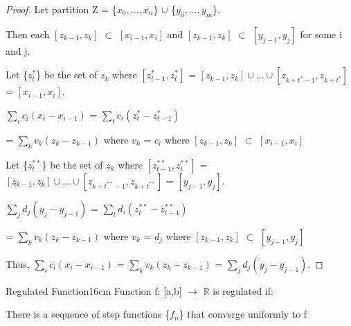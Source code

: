     \begin{proof}
        Let partition Z = \{$x_0,...,x_n$\} $\cup$ \{$y_0,...,y_m$\}.

        Then each $[z_{k-1},z_k]$ $\subset$ $[x_{i-1},x_i]$
        and $[z_{k-1},z_k]$ $\subset$ $[y_{j-1},y_j]$ for some i and j.

        Let \{$z_t^*$\} be the set of $z_k$
        where $[z_{t-1}^*,z_t^*]$
        = $[z_{k-1},z_k] \cup ... \cup [z_{k+t^*-1},z_{k+t^*}]$
        = $[x_{i-1},x_i]$.

        \hspace{0.5cm}
        $\sum_i c_i(x_i - x_{i-1})$
        = $\sum_t c_i(z_t^* - z_{t-1}^*)$
    
        \hspace{0.5cm}
        = $\sum_k v_k(z_k - z_{k-1})$
        \hspace{1cm}
        where $v_k$ = $c_i$ where $[z_{k-1},z_k]$ $\subset$ $[x_{i-1},x_i]$

        Let \{$z_t^{**}$\} be the set of $z_k$
        where $[z_{t-1}^{**},z_t^{**}]$
        = $[z_{k-1},z_k] \cup ... \cup [z_{k+t^{**}-1},z_{k+t^{**}}]$
        = $[y_{j-1},y_j]$.

        \hspace{0.5cm}
        $\sum_j d_j(y_j - y_{j-1})$
        = $\sum_t d_i(z_t^{**} - z_{t-1}^{**})$
    
        \hspace{0.5cm}
        = $\sum_k v_k(z_k - z_{k-1})$
        \hspace{1cm}
        where $v_k$ = $d_j$ where $[z_{k-1},z_k]$ $\subset$ $[y_{j-1},y_j]$

        Thus,
        $\sum_i c_i(x_i - x_{i-1})$
        = $\sum_k v_k(z_k - z_{k-1})$
        = $\sum_j d_j(y_j - y_{j-1})$.
    \end{proof}

    \vspace{0.5cm}



    \begin{definition}{Regulated Function}{16cm}
        Function f: [a,b] $\rightarrow$ $\mathbb{R}$
        is {\color{lblue} regulated} if:
        
        \hspace{0.5cm}
        There is a sequence of step functions \{$f_n$\}
        that converge uniformly to f
    \end{definition}

    \vspace{0.5cm}



